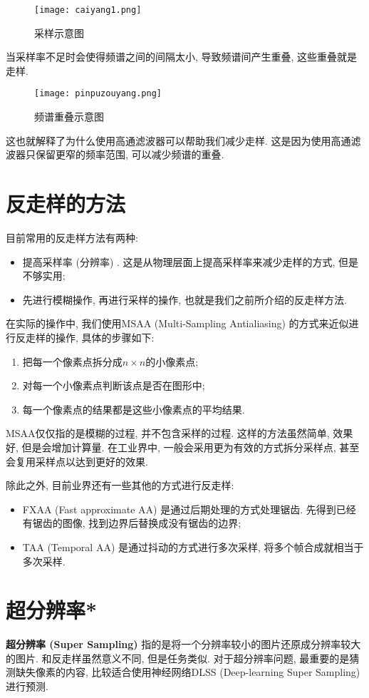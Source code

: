 \begin{figure}[H]
	\centering
	\texttt{[image: caiyang1.png]}
	\caption{采样示意图}
	\label{fig:caiyang}
\end{figure}
当采样率不足时会使得频谱之间的间隔太小, 导致频谱间产生重叠, 这些重叠就是走样. 

\begin{figure}[H]
	\centering
	\texttt{[image: pinpuzouyang.png]}
	\caption{频谱重叠示意图}
	\label{fig:pinpuzouyang}
\end{figure}

这也就解释了为什么使用高通滤波器可以帮助我们减少走样. 这是因为使用高通滤波器只保留更窄的频率范围, 可以减少频谱的重叠. 

\section{反走样的方法}
目前常用的反走样方法有两种: 
\begin{itemize}
	\item 提高采样率 (分辨率) . 这是从物理层面上提高采样率来减少走样的方式, 但是不够实用; 
	\item 先进行模糊操作, 再进行采样的操作, 也就是我们之前所介绍的反走样方法. 
\end{itemize}

在实际的操作中, 我们使用MSAA (Multi-Sampling Antialiasing) 的方式来近似进行反走样的操作, 具体的步骤如下: 
\begin{enumerate}
	\item 把每一个像素点拆分成$n\times n$的小像素点; 
	\item 对每一个小像素点判断该点是否在图形中; 
	\item 每一个像素点的结果都是这些小像素点的平均结果. 
\end{enumerate}
MSAA仅仅指的是模糊的过程, 并不包含采样的过程. 这样的方法虽然简单, 效果好, 但是会增加计算量. 在工业界中, 一般会采用更为有效的方式拆分采样点, 甚至会复用采样点以达到更好的效果. 

除此之外, 目前业界还有一些其他的方式进行反走样: 
\begin{itemize}
	\item FXAA (Fast approximate AA) 是通过后期处理的方式处理锯齿. 先得到已经有锯齿的图像, 找到边界后替换成没有锯齿的边界; 
	\item TAA (Temporal AA) 是通过抖动的方式进行多次采样, 将多个帧合成就相当于多次采样. 
\end{itemize}

\section{超分辨率*}
\textbf{超分辨率 (Super Sampling) }指的是将一个分辨率较小的图片还原成分辨率较大的图片. 和反走样虽然意义不同, 但是任务类似. 对于超分辨率问题, 最重要的是猜测缺失像素的内容, 比较适合使用神经网络DLSS (Deep-learning Super Sampling) 进行预测. 

